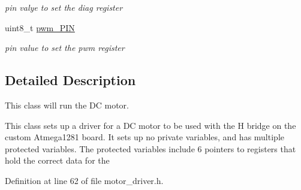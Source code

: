 \begin{DoxyCompactItemize}
\begin{DoxyCompactList}\small\item\em pin valye to set the diag register \end{DoxyCompactList}\item 
\hypertarget{classmotor__driver_accfb1e4405787b56c89636f5a14b5762}{uint8\-\_\-t \hyperlink{classmotor__driver_accfb1e4405787b56c89636f5a14b5762}{pwm\-\_\-\-P\-I\-N}}\label{classmotor__driver_accfb1e4405787b56c89636f5a14b5762}

\begin{DoxyCompactList}\small\item\em pin value to set the pwm register \end{DoxyCompactList}\end{DoxyCompactItemize}


\subsection{Detailed Description}
This class will run the D\-C motor. 

This class sets up a driver for a D\-C motor to be used with the H bridge on the custom Atmega1281 board. It sets up no private variables, and has multiple protected variables. The protected variables include 6 pointers to registers that hold the correct data for the 

Definition at line 62 of file motor\-\_\-driver.\-h.



